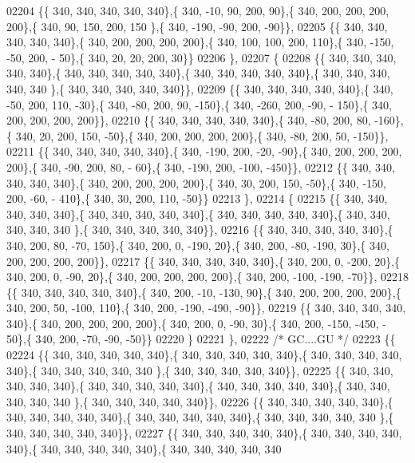 \begin{DoxyCode}
02204 \{\{ 340, 340, 340, 340, 340\},\{ 340, -10,  90, 200,  90\},\{ 340, 200, 200, 200, 200\},\{ 340,  90, 150, 200, 150
      \},\{ 340, -190, -90, 200, -90\}\},
02205 \{\{ 340, 340, 340, 340, 340\},\{ 340, 200, 200, 200, 200\},\{ 340, 100, 100, 200, 110\},\{ 340, -150, -50, 200, -
      50\},\{ 340,  20,  20, 200,  30\}\}
02206 \},
02207 \{
02208 \{\{ 340, 340, 340, 340, 340\},\{ 340, 340, 340, 340, 340\},\{ 340, 340, 340, 340, 340\},\{ 340, 340, 340, 340, 340
      \},\{ 340, 340, 340, 340, 340\}\},
02209 \{\{ 340, 340, 340, 340, 340\},\{ 340, -50, 200, 110, -30\},\{ 340, -80, 200,  90, -150\},\{ 340, -260, 200, -90, -
      150\},\{ 340, 200, 200, 200, 200\}\},
02210 \{\{ 340, 340, 340, 340, 340\},\{ 340, -80, 200,  80, -160\},\{ 340,  20, 200, 150, -50\},\{ 340, 200, 200, 200, 
      200\},\{ 340, -80, 200,  50, -150\}\},
02211 \{\{ 340, 340, 340, 340, 340\},\{ 340, -190, 200, -20, -90\},\{ 340, 200, 200, 200, 200\},\{ 340, -90, 200,  80, -
      60\},\{ 340, -190, 200, -100, -450\}\},
02212 \{\{ 340, 340, 340, 340, 340\},\{ 340, 200, 200, 200, 200\},\{ 340,  30, 200, 150, -50\},\{ 340, -150, 200, -60, -
      410\},\{ 340,  30, 200, 110, -50\}\}
02213 \},
02214 \{
02215 \{\{ 340, 340, 340, 340, 340\},\{ 340, 340, 340, 340, 340\},\{ 340, 340, 340, 340, 340\},\{ 340, 340, 340, 340, 340
      \},\{ 340, 340, 340, 340, 340\}\},
02216 \{\{ 340, 340, 340, 340, 340\},\{ 340, 200,  80, -70, 150\},\{ 340, 200,   0, -190,  20\},\{ 340, 200, -80, -190,  
      30\},\{ 340, 200, 200, 200, 200\}\},
02217 \{\{ 340, 340, 340, 340, 340\},\{ 340, 200,   0, -200,  20\},\{ 340, 200,   0, -90,  20\},\{ 340, 200, 200, 200, 
      200\},\{ 340, 200, -100, -190, -70\}\},
02218 \{\{ 340, 340, 340, 340, 340\},\{ 340, 200, -10, -130,  90\},\{ 340, 200, 200, 200, 200\},\{ 340, 200,  50, -100, 
      110\},\{ 340, 200, -190, -490, -90\}\},
02219 \{\{ 340, 340, 340, 340, 340\},\{ 340, 200, 200, 200, 200\},\{ 340, 200,   0, -90,  30\},\{ 340, 200, -150, -450, -
      50\},\{ 340, 200, -70, -90, -50\}\}
02220 \}
02221 \},
02222 \textcolor{comment}{/* GC....GU */}
02223 \{\{
02224 \{\{ 340, 340, 340, 340, 340\},\{ 340, 340, 340, 340, 340\},\{ 340, 340, 340, 340, 340\},\{ 340, 340, 340, 340, 340
      \},\{ 340, 340, 340, 340, 340\}\},
02225 \{\{ 340, 340, 340, 340, 340\},\{ 340, 340, 340, 340, 340\},\{ 340, 340, 340, 340, 340\},\{ 340, 340, 340, 340, 340
      \},\{ 340, 340, 340, 340, 340\}\},
02226 \{\{ 340, 340, 340, 340, 340\},\{ 340, 340, 340, 340, 340\},\{ 340, 340, 340, 340, 340\},\{ 340, 340, 340, 340, 340
      \},\{ 340, 340, 340, 340, 340\}\},
02227 \{\{ 340, 340, 340, 340, 340\},\{ 340, 340, 340, 340, 340\},\{ 340, 340, 340, 340, 340\},\{ 340, 340, 340, 340, 340

\end{DoxyCode}
